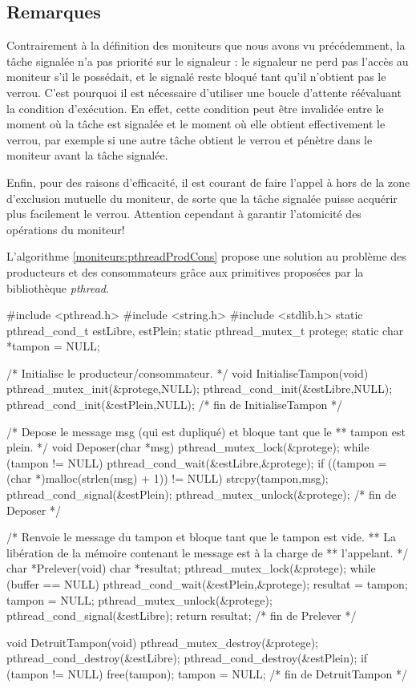 \subsection*{Remarques}
Contrairement à la définition des moniteurs que nous avons vu précédemment, la tâche signalée n'a pas priorité sur le signaleur : le signaleur ne perd pas l'accès au moniteur s'il le possédait, et le signalé reste bloqué tant qu'il n'obtient pas le verrou. C'est pourquoi il est nécessaire d'utiliser une boucle d'attente réévaluant la condition d'exécution. En effet, cette condition peut être invalidée entre le moment où la tâche est signalée et le moment où elle obtient effectivement le verrou, par exemple si une autre tâche obtient le verrou et pénètre dans le moniteur avant la tâche signalée.

Enfin, pour des raisons d'efficacité, il est courant de faire l'appel à  hors de la zone d'exclusion mutuelle du moniteur, de sorte que la tâche signalée puisse acquérir plus facilement le verrou. Attention cependant à garantir l'atomicité des opérations du moniteur!

L'algorithme \ref{moniteurs:pthreadProdCons} propose une solution au problème des producteurs et des consommateurs grâce aux primitives proposées par la bibliothèque {\em pthread}.

\begin{codeblock}[title=Problème des producteurs et des consommateurs par moniteur,label=moniteurs:pthreadProdCons]
#include <pthread.h>
#include <string.h>
#include <stdlib.h>
static pthread_cond_t estLibre, estPlein;
static pthread_mutex_t protege;
static char *tampon = NULL;

/* Initialise le producteur/consommateur. */
void InitialiseTampon(void)
{
  pthread_mutex_init(&protege,NULL);
  pthread_cond_init(&estLibre,NULL);
  pthread_cond_init(&estPlein,NULL);
} /* fin de InitialiseTampon */

/* Depose le message msg (qui est dupliqué) et bloque tant que le
** tampon est plein. */
void Deposer(char *msg) {
  pthread_mutex_lock(&protege);
  while (tampon != NULL)
     pthread_cond_wait(&estLibre,&protege);
  if ((tampon = (char *)malloc(strlen(msg) + 1)) != NULL) {
     strcpy(tampon,msg);
     pthread_cond_signal(&estPlein);
  }
  pthread_mutex_unlock(&protege);
} /* fin de Deposer */

/* Renvoie le message du tampon et bloque tant que le tampon est vide.
** La libération de la mémoire contenant le message est à la charge de
** l'appelant. */
char *Prelever(void) {
  char *resultat;
  pthread_mutex_lock(&protege);
  while (buffer == NULL)
     pthread_cond_wait(&estPlein,&protege);
  resultat = tampon;
  tampon = NULL;
  pthread_mutex_unlock(&protege);
  pthread_cond_signal(&estLibre);
  return resultat;
} /* fin de Prelever */

void DetruitTampon(void) {
  pthread_mutex_destroy(&protege);
  pthread_cond_destroy(&estLibre);
  pthread_cond_destroy(&estPlein);
  if (tampon != NULL) {
     free(tampon);
     tampon = NULL;
  }
} /* fin de DetruitTampon */
\end{codeblock}

